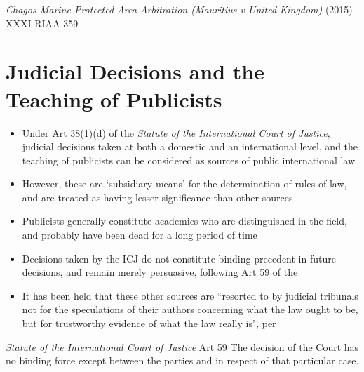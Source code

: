 \begin{casedetails}{\textit{Chagos Marine Protected Area Arbitration (Mauritius v United Kingdom)} (2015) XXXI RIAA 359}
\end{casedetails}

\section{Judicial Decisions and the Teaching of Publicists}
\begin{itemize}
    \item Under Art 38(1)(d) of the \textit{Statute of the International Court of Justice}, judicial decisions taken at both a domestic and an international level, and the teaching of publicists can be considered as sources of public international law
    \item However, these are `subsidiary means' for the determination of rules of law, and are treated as having lesser significance than other sources
    \item Publicists generally constitute academics who are distinguished in the field, and probably have been dead for a long period of time
    \item Decisions taken by the ICJ do not constitute binding precedent in future decisions, and remain merely persuasive, following Art 59 of the 
    \item It has been held that these other sources are ``resorted to by judicial tribunals not for the speculations of their authors concerning what the law ought to be, but for trustworthy evidence of what the law really is", per 
\end{itemize}
\begin{statutedetails}{\textit{Statute of the International Court of Justice} Art 59}
    \flushleft
    The decision of the Court has no binding force except between the parties and in respect of that particular case.
\end{statutedetails}

